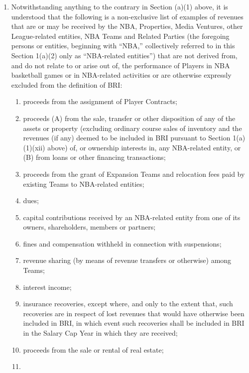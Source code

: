 \documentclass[
]{book}
\providecommand{\tightlist}{%
  \setlength{\itemsep}{0pt}\setlength{\parskip}{0pt}}
\begin{document}
\begin{enumerate}
\begin{enumerate}
\begin{enumerate}
    \end{enumerate}
  \item
    Notwithstanding anything to the contrary in Section (a)(1) above, it is understood that the following is a non-exclusive list of examples of revenues that are or may be received by the NBA, Properties, Media Ventures, other League-related entities, NBA Teams and Related Parties (the foregoing persons or entities, beginning with ``NBA,'' collectively referred to in this Section 1(a)(2) only as ``NBA-related entities'') that are not derived from, and do not relate to or arise out of, the performance of Players in NBA basketball games or in NBA-related activities or are otherwise expressly excluded from the definition of BRI:

    \begin{enumerate}
    \def\labelenumiii{(\roman{enumiii})}
    \tightlist
    \item
      proceeds from the assignment of Player Contracts;
    \item
      proceeds (A) from the sale, transfer or other disposition of any of the assets or property (excluding ordinary course sales of inventory and the revenues (if any) deemed to be included in BRI pursuant to Section 1(a)(1)(xii) above) of, or ownership interests in, any NBA-related entity, or (B) from loans or other financing transactions;
    \item
      proceeds from the grant of Expansion Teams and relocation fees paid by existing Teams to NBA-related entities;
    \item
      dues;
    \item
      capital contributions received by an NBA-related entity from one of its owners, shareholders, members or partners;
    \item
      fines and compensation withheld in connection with suspensions;
    \item
      revenue sharing (by means of revenue transfers or otherwise) among Teams;
    \item
      interest income;
    \item
      insurance recoveries, except where, and only to the extent that, such recoveries are in respect of lost revenues that would have otherwise been included in BRI, in which event such recoveries shall be included in BRI in the Salary Cap Year in which they are received;
    \item
      proceeds from the sale or rental of real estate;
    \item

\end{enumerate}
\end{enumerate}
\end{enumerate}
\end{document}
